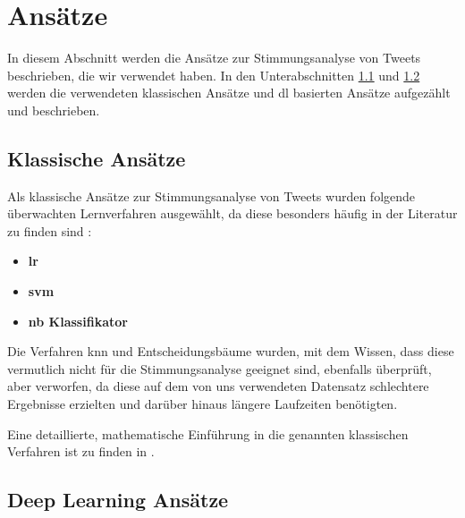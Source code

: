 \section{Ansätze}

In diesem Abschnitt werden die Ansätze zur Stimmungsanalyse von Tweets beschrieben, die wir verwendet haben.
In den Unterabschnitten \ref{subsec:klassische-ansaetze} und \ref{subsec:deep-learning-ansaetze} werden die verwendeten klassischen Ansätze und \gls{dl} basierten Ansätze aufgezählt und beschrieben.

\subsection{Klassische Ansätze}\label{subsec:klassische-ansaetze}

Als klassische Ansätze zur Stimmungsanalyse von Tweets wurden folgende überwachten Lernverfahren ausgewählt, da diese besonders häufig in der Literatur zu finden sind \cite{medhat2014sentiment, wankhade2022survey, zimbra2018state}:

\begin{itemize}
    \item \textbf{\gls{lr}}  \hspace{\fill}
    \item \textbf{\gls{svm}} \hspace{\fill}
    \item \textbf{\gls{nb} Klassifikator} \hspace{\fill}
\end{itemize}

Die Verfahren \gls{knn} und Entscheidungsbäume wurden, mit dem Wissen, dass diese vermutlich nicht für die Stimmungsanalyse geeignet sind, ebenfalls überprüft, aber verworfen, da diese auf dem von uns verwendeten Datensatz schlechtere Ergebnisse erzielten und darüber hinaus längere Laufzeiten benötigten.

Eine detaillierte, mathematische Einführung in die genannten klassischen Verfahren ist zu finden in \cite[vgl. die Kapitel 4.4 für \gls{lr}, 4.5 und 12 für \gls{svm}, 6.6.3 für den \gls{nb} Klassifikator, 13.3 für \gls{knn} und 9.2 für Entscheidungsbäume]{hastie2009elements}.

\subsection{Deep Learning Ansätze}\label{subsec:deep-learning-ansaetze}

